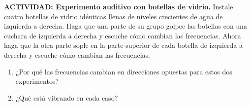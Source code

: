 \item \textbf{ACTIVIDAD: Experimento auditivo con botellas de vidrio.}
Instale cuatro botellas de vidrio idénticas llenas de niveles crecientes de agua de izquierda a derecha. Haga que una parte de su grupo golpee las botellas con una cuchara de izquierda a derecha y escuche cómo cambian las frecuencias. Ahora haga que la otra parte sople en la parte superior de cada botella de izquierda a derecha y escuche cómo cambian las frecuencias.
\begin{enumerate}
    \item ¿Por qué las frecuencias cambian en direcciones opuestas para estos dos experimentos?
    \item ¿Qué está vibrando en cada caso?
\end{enumerate}